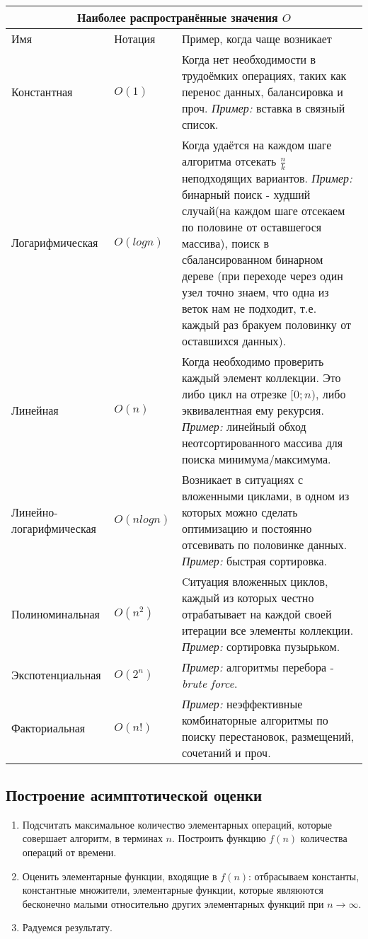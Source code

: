 \begin{tabular}{|p{4.5cm}|p{2.5cm}|p{10cm}|}
    \hline
    \multicolumn{3}{|c|}{Наиболее распространённые значения $O$}\\
    \hline
     Имя&  Нотация&Пример, когда чаще возникает\\
    \hline
    Константная &$O(1)$ &Когда нет необходимости в трудоёмких операциях, таких как перенос данных, балансировка и проч. \textit{Пример:} вставка в связный список.\\
    \hline
    Логарифмическая &$O(log n)$ & Когда удаётся на каждом шаге алгоритма отсекать $\frac{n}{k}$ неподходящих вариантов. \textit{Пример:} бинарный поиск - худший случай(на каждом шаге отсекаем по половине от оставшегося массива), поиск в сбалансированном бинарном дереве (при переходе через один узел точно знаем, что одна из веток нам не подходит, т.е. каждый раз бракуем половинку от оставшихся данных).\\
    \hline
    Линейная &$O(n)$ & Когда необходимо проверить каждый элемент коллекции. Это либо цикл на отрезке $[0;n)$, либо эквивалентная ему рекурсия. \textit{Пример:} линейный обход неотсортированного массива для поиска минимума/максимума.\\
    \hline
    Линейно-логарифмическая &$O(n log n)$ & Возникает в ситуациях с вложенными циклами, в одном из которых можно сделать оптимизацию и постоянно отсевивать по половинке данных. \textit{Пример:} быстрая сортировка.\\
    \hline
    Полиноминальная &$O(n^2)$ & Cитуация вложенных циклов, каждый из которых честно отрабатывает на каждой своей итерации все элементы коллекции. \textit{Пример:} сортировка пузырьком.\\
    \hline
    Экспотенциальная &$O(2^n)$ & \textit{Пример:} алгоритмы перебора - \textit{brute force}.\\
    \hline
    Факториальная &$O(n!)$ & \textit{Пример:} неэффективные комбинаторные алгоритмы по поиску перестановок, размещений, сочетаний и проч.\\
    \hline
\end{tabular}

\subsection{Построение асимптотической оценки}
\begin{enumerate}
    \item Подсчитать максимальное количество элементарных операций, которые совершает алгоритм, в терминах $n$. Построить функцию $f(n)$ количества операций от времени.
    \item Оценить элементарные функции, входящие в $f(n)$: отбрасываем константы, константные множители, элементарные функции, которые являюются бесконечно малыми относительно других элементарных функций при $n \rightarrow \infty$.
    \item Радуемся результату.
\end{enumerate}


